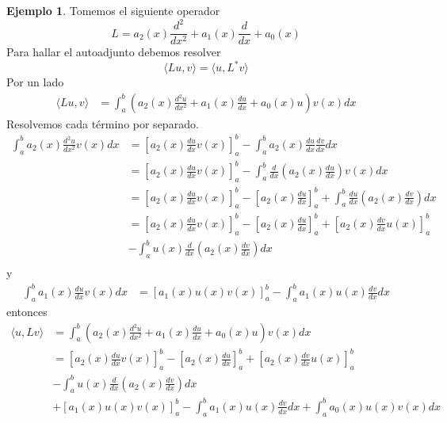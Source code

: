 \documentclass[11pt]{book}
\theoremstyle{plain}
\theoremstyle{definition}
\newtheorem{ejemplo}[proposición]{Ejemplo}
\begin{document}
    \begin{ejemplo}
        Tomemos el siguiente operador
        \[
            L = a_2(x)\frac{d^{2}}{dx^{2}} + a_1(x)\frac{d}{dx} + a_0(x)
        \]
        Para hallar el autoadjunto debemos resolver
        \[
            \langle Lu, v \rangle = \langle u, L^{*}v \rangle
        \]
        Por un lado
        \begin{align*}
            \langle Lu, v \rangle &= \int_{a}^{b} \left(a_2(x)\frac{d^{2}u}{dx^{2}} + a_1(x)\frac{du}{dx} + a_0(x)u\right)v(x)dx
        \end{align*}
        Resolvemos cada término por separado.
        \begin{align*}
            \int_{a}^{b} a_2(x)\frac{d^{2}u}{dx^{2}}v(x)dx &= \left[a_2(x)\frac{du}{dx}v(x)\right]_{a}^{b} - \int_{a}^{b} a_2(x)\frac{du}{dx}\frac{dv}{dx}dx\\
            &= \left[a_2(x)\frac{du}{dx}v(x)\right]_{a}^{b} - \int_{a}^{b} \frac{d}{dx}\left(a_2(x)\frac{du}{dx}\right)v(x)dx\\
            &= \left[a_2(x)\frac{du}{dx}v(x)\right]_{a}^{b} - \left[a_2(x)\frac{du}{dx}\right]_{a}^{b} + \int_{a}^{b} \frac{du}{dx}\left(a_2(x)\frac{dv}{dx}\right)dx\\
            &= \left[a_2(x)\frac{du}{dx}v(x)\right]_{a}^{b} - \left[a_2(x)\frac{du}{dx}\right]_{a}^{b} + \left[a_2(x)\frac{dv}{dx}u(x)\right]_{a}^{b} \\
            &- \int_{a}^{b} u(x)\frac{d}{dx}\left(a_2(x)\frac{dv}{dx}\right)dx\\
        \end{align*}
        y
        \begin{align*}
            \int_{a}^{b} a_1(x)\frac{du}{dx}v(x)dx &= \left[a_1(x)u(x)v(x)\right]_{a}^{b} - \int_{a}^{b} a_1(x)u(x)\frac{dv}{dx}dx
        \end{align*}
        entonces
        \begin{align*}
            \langle u, Lv \rangle &= \int_{a}^{b} \left(a_2(x)\frac{d^{2}u}{dx^{2}} + a_1(x)\frac{du}{dx} + a_0(x)u\right)v(x)dx\\
            &= \left[a_2(x)\frac{du}{dx}v(x)\right]_{a}^{b} - \left[a_2(x)\frac{du}{dx}\right]_{a}^{b} + \left[a_2(x)\frac{dv}{dx}u(x)\right]_{a}^{b} \\
            &- \int_{a}^{b} u(x)\frac{d}{dx}\left(a_2(x)\frac{dv}{dx}\right)dx\\
            &+ \left[a_1(x)u(x)v(x)\right]_{a}^{b} - \int_{a}^{b} a_1(x)u(x)\frac{dv}{dx}dx + \int_{a}^{b} a_0(x)u(x)v(x)dx

\end{align*}
\end{ejemplo}
\end{document}
